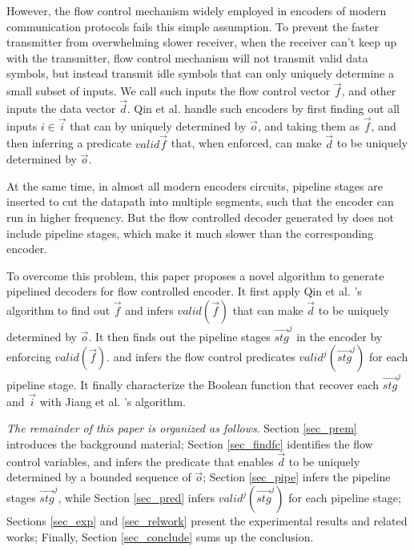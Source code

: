 \documentclass[runningheads,a4paper]{llncs}
\begin{document}
However,
the flow control mechanism widely employed in encoders of modern communication protocols
fails this simple assumption.
To prevent the faster transmitter from overwhelming slower receiver,
when the receiver can't keep up with the transmitter,
flow control mechanism \cite{flowcontrol} will not transmit valid data symbols,
but instead transmit idle symbols that can only uniquely determine a small subset of inputs.
We call such inputs the flow control vector $\vec{f}$,
and other inputs the data vector $\vec{d}$.
Qin et al. \cite{QinTODAES15} handle such encoders by
first finding out all inputs $i\in\vec{i}$ that can by uniquely determined by $\vec{o}$,
and taking them as $\vec{f}$,
and then inferring a predicate $valid{\vec{f}}$ that,
when enforced,
can make $\vec{d}$ to be uniquely determined by $\vec{o}$.


At the same time,
in almost all modern encoders circuits,
pipeline stages are inserted to cut the datapath into multiple segments,
such that the encoder can run in higher frequency.
But the flow controlled decoder generated by \cite{QinTODAES15} does not include pipeline stages,
which make it much slower than the corresponding encoder.

To overcome this problem,
this paper proposes a novel algorithm to generate pipelined decoders for flow controlled encoder.
It first apply Qin et al. \cite{QinTODAES15}'s algorithm to find out $\vec{f}$ and infers $valid(\vec{f})$ that can make $\vec{d}$ to be uniquely 
determined by $\vec{o}$.
It then finds out the pipeline stages $\vec{stg}^j$ in the encoder by enforcing $valid(\vec{f})$.
and infers the flow control predicates $valid^j(\vec{stg}^j)$ for each pipeline stage.
It finally characterize the Boolean function that recover each $\vec{stg}^j$ and $\vec{i}$ with 
Jiang et al. \cite{InterpBoolFunction}'s algorithm.

\emph{The remainder of this paper is organized as follows}.
Section \ref{sec_prem} introduces the background material;
Section \ref{sec_findfc} identifies the flow control variables,
and infers the predicate that enables $\vec{d}$ 
to be uniquely determined by a bounded sequence of $\vec{o}$;
Section \ref{sec_pipe} infers the pipeline stages $\vec{stg}^j$,
while Section \ref{sec_pred} infers  $valid^j(\vec{stg}^j)$ for each pipeline stage;
Sections \ref{sec_exp} and \ref{sec_relwork} present the experimental results and related works;
Finally,
Section \ref{sec_conclude} sums up the conclusion.
\end{document}

